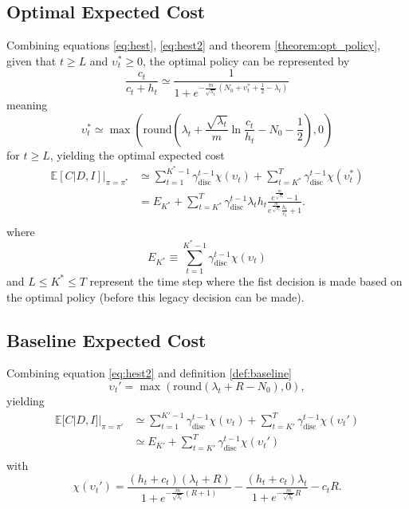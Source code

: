 \subsection{Optimal Expected Cost}
Combining equations \eqref{eq:hest}, \eqref{eq:hest2} and theorem \ref{theorem:opt_policy}, given that $t\geq L$ and $\upsilon_t^*\geq 0$, the optimal policy can be represented by
\begin{equation}
	\frac{c_t}{c_t+h_t}\simeq\frac{1}{1+e^{-\frac{m}{\sqrt{\lambda_t}}(N_0+\upsilon_t^*+\frac{1}{2}-\lambda_t)}}
\end{equation}
meaning
\begin{equation}
	\upsilon_t^* \simeq \max(\text{round}(\lambda_t+\frac{\sqrt{\lambda_t}}{m}\ln\frac{c_t}{h_t}-N_0-\frac{1}{2}),0)
\end{equation}
for $t\geq L$, yielding the optimal expected cost
\begin{equation}
	\begin{split}
		\mathbb{E}[C|D,I]\big|_{\pi=\pi^*} &\simeq \sum_{t=1}^{K^*-1}\gamma_{\text{disc}}^{t-1}\chi(\upsilon_t)+ \sum_{t=K^*}^{T} \gamma_{\text{disc}}^{t-1} \chi(\upsilon_t^*)\\
		&= E_{K^*}+\sum_{t=K^*}^{T} \gamma_{\text{disc}}^{t-1} \lambda_th_t\frac{e^{\frac{m}{\sqrt{\lambda_t}}}-1}{e^{\frac{m}{\sqrt{\lambda_t}}}\frac{h_t}{c_t}+1}.\\
	\end{split}
	\label{eq:opt_cost}
\end{equation}
where
\begin{equation}
	E_{K^*}\equiv \sum_{t=1}^{K^*-1}\gamma_{\text{disc}}^{t-1}\chi(\upsilon_t)
\end{equation}
and $L\leq K^* \leq T$ represent the time step where the fist decision is made based on the optimal policy (before this legacy decision can be made).

\subsection{Baseline Expected Cost}
Combining equation \eqref{eq:hest2} and definition \ref{def:baseline}
\begin{equation}  
	\upsilon_t' = \max(\text{round}(\lambda_t + R - N_0), 0), 
\end{equation} 
yielding
\begin{equation}
	\begin{split}
		\mathbb{E}[C|D,I]|_{\pi = \pi'} &\simeq \sum_{t=1}^{K'-1}\gamma_{\text{disc}}^{t-1}\chi(\upsilon_t)+\sum_{t=K'}^{T} \gamma_{\text{disc}}^{t-1} \chi(\upsilon_t')\\
		&\simeq E_{K'}+\sum_{t=K'}^{T} \gamma_{\text{disc}}^{t-1} \chi(\upsilon_t')\\
	\end{split}
	\label{eq:bas_cost}
\end{equation}
with
\begin{equation}
	\chi(\upsilon_t') = 
	\frac{(h_t+c_t)(\lambda_t+R)}{1+e^{-\frac{m}{\sqrt{\lambda_t}}(R+1)}}- \frac{(h_t+c_t)\lambda_t}{1+e^{-\frac{m}{\sqrt{\lambda_t}}R}} - c_tR.
\end{equation}

